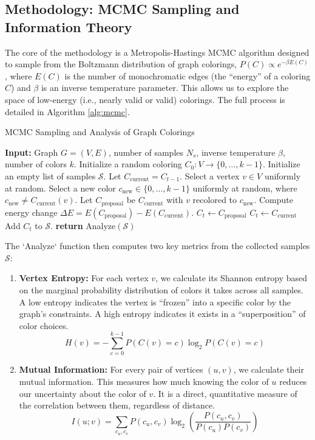 \documentclass[12pt, letterpaper]{article}
\begin{document}
\subsection{Methodology: MCMC Sampling and Information Theory}
The core of the methodology is a Metropolis-Hastings MCMC algorithm designed to sample from the Boltzmann distribution of graph colorings, $P(C) \propto e^{-\beta E(C)}$, where $E(C)$ is the number of monochromatic edges (the ``energy'' of a coloring $C$) and $\beta$ is an inverse temperature parameter. This allows us to explore the space of low-energy (i.e., nearly valid or valid) colorings. The full process is detailed in Algorithm \ref{alg:mcmc}.

\begin{algorithm}
\caption{MCMC Sampling and Analysis of Graph Colorings}
\label{alg:mcmc}
\begin{algorithmic}[1]
\State \textbf{Input:} Graph $G=(V,E)$, number of samples $N_s$, inverse temperature $\beta$, number of colors $k$.
\State Initialize a random coloring $C_0: V \to \{0, \ldots, k-1\}$.
\State Initialize an empty list of samples $\mathcal{S}$.
    \State Let $C_{\text{current}} = C_{t-1}$.
    \State Select a vertex $v \in V$ uniformly at random.
    \State Select a new color $c_{\text{new}} \in \{0, \ldots, k-1\}$ uniformly at random, where $c_{\text{new}} \neq C_{\text{current}}(v)$.
    \State Let $C_{\text{proposal}}$ be $C_{\text{current}}$ with $v$ recolored to $c_{\text{new}}$.
    \State Compute energy change $\Delta E = E(C_{\text{proposal}}) - E(C_{\text{current}})$.
        \State $C_t \leftarrow C_{\text{proposal}}$ 
    \Else
        \State $C_t \leftarrow C_{\text{current}}$ 
    \EndIf
    \State Add $C_t$ to $\mathcal{S}$.
\EndFor
\State \textbf{return} Analyze$(\mathcal{S})$
\end{algorithmic}
\end{algorithm}

The `Analyze` function then computes two key metrics from the collected samples $\mathcal{S}$:
\begin{enumerate}
    \item \textbf{Vertex Entropy:} For each vertex $v$, we calculate its Shannon entropy based on the marginal probability distribution of colors it takes across all samples. A low entropy indicates the vertex is ``frozen'' into a specific color by the graph's constraints. A high entropy indicates it exists in a ``superposition'' of color choices.
    $$ H(v) = -\sum_{c=0}^{k-1} P(C(v)=c) \log_2 P(C(v)=c) $$
    \item \textbf{Mutual Information:} For every pair of vertices $(u, v)$, we calculate their mutual information. This measures how much knowing the color of $u$ reduces our uncertainty about the color of $v$. It is a direct, quantitative measure of the correlation between them, regardless of distance.
    $$ I(u; v) = \sum_{c_u, c_v} P(c_u, c_v) \log_2\left(\frac{P(c_u, c_v)}{P(c_u)P(c_v)}\right) $$
\end{enumerate}
\end{document}
